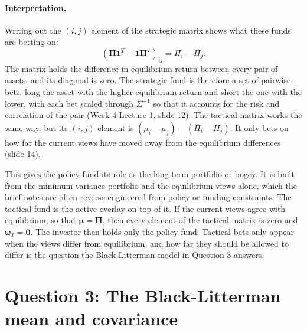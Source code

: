 \documentclass[11pt]{article}
\numberwithin{equation}{section}
\begin{document}
\paragraph{Interpretation.}
Writing out the $(i,j)$ element of the strategic matrix shows what these funds are betting on:
\begin{equation*}
  \left(\bm{\Pi}\mathbf{1}^{T} - \mathbf{1}\bm{\Pi}^{T}\right)_{ij} = \Pi_{i} - \Pi_{j}.
\end{equation*}
The matrix holds the difference in equilibrium return between every pair of assets, and its diagonal is zero. The strategic fund is therefore a set of pairwise bets, long the asset with the higher equilibrium return and short the one with the lower, with each bet scaled through $\Sigma^{-1}$ so that it accounts for the risk and correlation of the pair (Week 4 Lecture 1, slide 12). The tactical matrix works the same way, but its $(i,j)$ element is $(\mu_{i} - \mu_{j}) - (\Pi_{i} - \Pi_{j})$. It only bets on how far the current views have moved away from the equilibrium differences (slide 14).

This gives the policy fund its role as the long-term portfolio or bogey. It is built from the minimum variance portfolio and the equilibrium views alone, which the brief notes are often reverse engineered from policy or funding constraints. The tactical fund is the active overlay on top of it. If the current views agree with equilibrium, so that $\bm{\mu} = \bm{\Pi}$, then every element of the tactical matrix is zero and $\bm{\omega}_{T} = \mathbf{0}$. The investor then holds only the policy fund. Tactical bets only appear when the views differ from equilibrium, and how far they should be allowed to differ is the question the Black-Litterman model in Question 3 answers.

\section*{Question 3: The Black-Litterman mean and covariance}
\setcounter{section}{3}
\setcounter{subsection}{0}
\setcounter{equation}{0}
\label{sec:q3}
\end{document}

